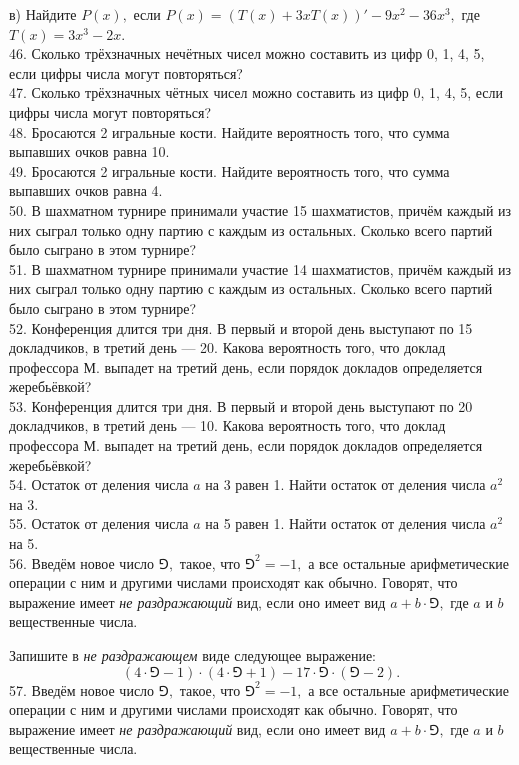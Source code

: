 \documentclass[12pt]{article}
\begin{document}
в) Найдите $P(x),$ если $P(x)=(T(x)+3xT(x))'-9x^2-36x^3,$ где $T(x)=3x^3-2x.$\\
46. Сколько трёхзначных нечётных чисел можно составить из цифр 0, 1, 4, 5, если цифры числа могут повторяться?\\
47. Сколько трёхзначных чётных чисел можно составить из цифр 0, 1, 4, 5, если цифры числа могут повторяться?\\
48. Бросаются 2 игральные кости. Найдите вероятность того, что сумма выпавших очков равна 10.\\
49. Бросаются 2 игральные кости. Найдите вероятность того, что сумма выпавших очков равна 4.\\
50. В шахматном турнире принимали участие 15 шахматистов, причём каждый из них сыграл только одну партию с каждым из остальных. Сколько всего партий было сыграно в этом турнире?\\
51. В шахматном турнире принимали участие 14 шахматистов, причём каждый из них сыграл только одну партию с каждым из остальных. Сколько всего партий было сыграно в этом турнире?\\
52. Конференция длится три дня. В первый и второй день выступают по 15 докладчиков, в третий день --- 20. Какова вероятность того, что доклад профессора М. выпадет на третий день, если порядок докладов определяется жеребьёвкой?\\
53. Конференция длится три дня. В первый и второй день выступают по 20 докладчиков, в третий день --- 10. Какова вероятность того, что доклад профессора М. выпадет на третий день, если порядок докладов определяется жеребьёвкой?\\
54. Остаток от деления числа $a$ на 3 равен 1. Найти остаток от деления числа $a^2$ на 3.\\
55. Остаток от деления числа $a$ на 5 равен 1. Найти остаток от деления числа $a^2$ на 5.\\
56. Введём новое число $\Game,$ такое, что $\Game^2=-1,$ а все остальные арифметические операции с ним и другими числами происходят как обычно. Говорят, что выражение имеет {\it не раздражающий} вид, если оно имеет вид $a+b\cdot\Game,$ где $a$ и $b$ вещественные числа.

Запишите в {\it не раздражающем} виде следующее выражение:
$$(4\cdot\Game-1)\cdot(4\cdot\Game+1)-17\cdot\Game\cdot(\Game-2).$$
57. Введём новое число $\Game,$ такое, что $\Game^2=-1,$ а все остальные арифметические операции с ним и другими числами происходят как обычно. Говорят, что выражение имеет {\it не раздражающий} вид, если оно имеет вид $a+b\cdot\Game,$ где $a$ и $b$ вещественные числа.
\end{document}
